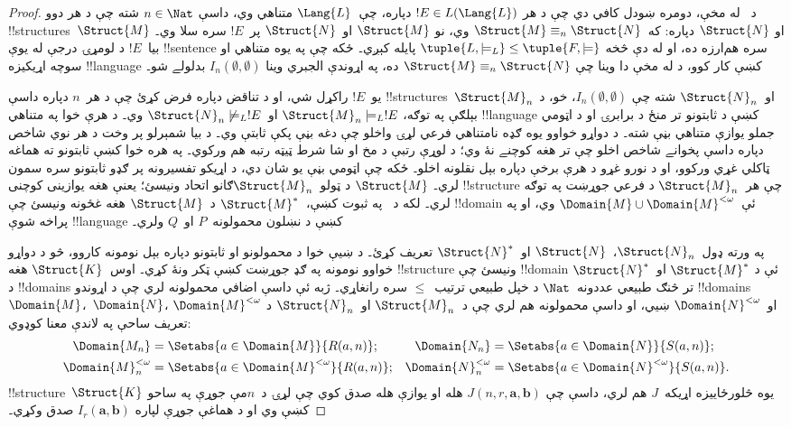 \documentclass[../../../include/open-logic-section]{subfiles}
\begin{document}
\begin{proof}
د~ له مخې، دومره ښودل کافي دي چې د هر
$!E \in L(\Lang{L})$ دپاره، چې~$\Lang{L}$ متناهي وي، داسې
$n \in \Nat$ شته چې د هر دوو !!{structure}s~$\Struct{M}$ او
$\Struct{N}$ دپاره: که~$\Struct{M} \equiv_n \Struct{N}$ وي، نو
$\Struct{M}$ او~$\Struct{N}$ پر~$!E$ سره سلا وي۔ بيا~$!E$ د لومړۍ
درجې له يوې !!{sentence} سره هم‌ارزه ده، او له دې څخه
$\tuple{L, \models_L} \le \tuple{F, \models}$ پايله کېږي۔ ځکه چې په
يوه متناهي او سوچه اړيکيزه !!{language} کښې کار کوو، د
 له مخې دا وينا چې
$\Struct{M} \equiv_n \Struct{N}$ ده، په اړوندې الجبري وينا
$I_n(\emptyset,\emptyset)$ بدلولے شو۔

يو~$!E$ راکړل شي، او د تناقض دپاره فرض کړئ چې د هر~$n$ دپاره داسې
!!{structure}s~$\Struct{M}_n$ او~$\Struct{N}_n$ شته چې
$I_n(\emptyset, \emptyset)$، خو، د بېلګې په توګه،
$\Struct{M}_n \models_L !E$ او~$\Struct{N}_n \not\models_L !E$ وي۔
د هرې خوا په متناهي !!{language} کښې د ثابتونو تر منځ د برابرۍ او د اټومي جملو يوازې متناهي بڼې شته۔ د دواړو خواوو يوه ګډه نامتناهي فرعي لړۍ واخلو چې دغه بڼې پکې ثابتې وي۔ د بيا شمېرلو پر وخت د هر نوي شاخص دپاره داسې پخوانے شاخص اخلو چې تر هغه کوچنے نۀ وي؛ د لوړې رتبې د مخ او شا شرط ټيټه رتبه هم ورکوي۔ په هره خوا کښې ثابتونو ته هماغه ټاکلي غړي ورکوو، او د نورو غړو د هرې برخې دپاره بېل نقلونه اخلو۔ ځکه چې اټومي بڼې يو شان دي، د اړيکو تفسيرونه پر ګډو ثابتونو سره سمون لري۔ $\Struct{M}$ د ټولو~$\Struct{M}_n$ګانو اتحاد
ونيسئ؛ يعنې هغه يوازينی کوچنی !!{structure} چې هر~$\Struct{M}_n$ د
فرعي جوړښت په توګه لري۔ لکه د~ په
ثبوت کښې،~$\Struct{M}^*$ د~$\Struct{M}$ هغه غځونه ونيسئ چې !!{domain}
ئې~$\Domain{M} \cup \Domain{M}^{<\omega}$ وي، او په پراخه شوې
!!{language} کښې د نښلون محمولونه~$P$ او~$Q$ ولري۔

په ورته ډول~$\Struct{N}_n$،~$\Struct{N}$ او~$\Struct{N}^*$ تعريف
کړئ۔ د ښيې خوا د محمولونو او ثابتونو دپاره بېل نومونه کاروو، څو د دواړو خواوو نومونه په ګډ جوړښت کښې ټکر ونۀ کړي۔ اوس~$\Struct{K}$ هغه !!{structure} ونيسئ چې !!{domain} ئې د
$\Struct{M}^*$ او~$\Struct{N}^*$ د !!{domain}s تر څنګ طبيعي
عددونه~$\Nat$ د خپل طبيعي ترتيب~$\le$ سره رانغاړي۔ ژبه ئې داسې
اضافي محمولونه لري چې د اړوندو !!{domain}s~$\Domain{M}$،~$\Domain{N}$،
$\Domain{M}^{<\omega}$ او~$\Domain{N}^{<\omega}$ ښيي، او داسې
محمولونه هم لري چې د~$\Struct{M}_n$ او~$\Struct{N}_n$ د تعريف
ساحې په لاندې معنا کوډوي:
\begin{align*}
  \Domain{M_n} & = \Setabs{a \in \Domain{M}}{R(a, n)}; &
  \Domain{N_n} & = \Setabs{a \in \Domain{N}}{S(a,n)}; \\
  \Domain{M}^{<\omega}_n & = \Setabs{a \in \Domain{M}^{<\omega}}{R(a,n)}; &
  \Domain{N}^{<\omega}_n & = \Setabs{a \in \Domain{N}^{<\omega}}{S(a,n)}.
\end{align*}
!!{structure}~$\Struct{K}$ يوه څلورځاييزه اړيکه~$J$ هم لري، داسې چې
$J(n,r,\mathbf{a},\mathbf{b})$ هله او يوازې هله صدق کوي چې لړۍ د~$n$مې جوړې په ساحو کښې وي او د هماغې جوړې لپاره $I_r(\mathbf{a},\mathbf{b})$ صدق وکړي۔


\end{proof}
\end{document}
